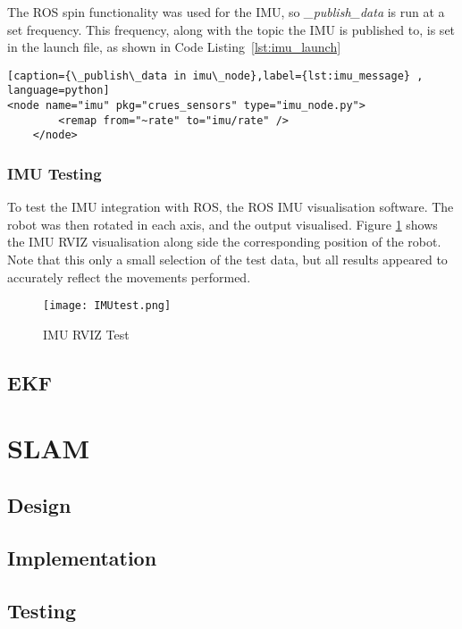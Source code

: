The ROS spin functionality was used for the IMU, so
\textit{\_publish\_data} is run at a set
frequency. This frequency, along with the topic the
IMU is published to, is set in the launch file, as
shown in Code Listing~\ref{lst:imu_launch}

\begin{lstlisting}[caption={\_publish\_data in imu\_node},label={lst:imu_message} , language=python]
<node name="imu" pkg="crues_sensors" type="imu_node.py">
        <remap from="~rate" to="imu/rate" />
    </node>
\end{lstlisting}

\subsubsection{IMU Testing}\label{soft/odometry/imu/test}

To test the IMU integration with ROS, the ROS IMU visualisation software. 
The robot was then rotated in each axis, and the output visualised.  
Figure \ref{fig:imu_test} shows the IMU RVIZ visualisation along side the 
corresponding position of the robot. Note that this only a small selection 
of the test data, but all results appeared to accurately reflect the 
movements performed.

\begin{figure}[!ht]
	\centering
	\texttt{[image: IMUtest.png]}
	\caption{IMU RVIZ Test}\label{fig:imu_test}
\end{figure}

\subsection{EKF}\label{soft/odometry/test}


\section{SLAM}\label{soft/SLAM}

\subsection{Design}\label{soft/SLAM/design}

\subsection{Implementation}\label{soft/SLAM/impl}

\subsection{Testing}\label{soft/SLAM/test}



